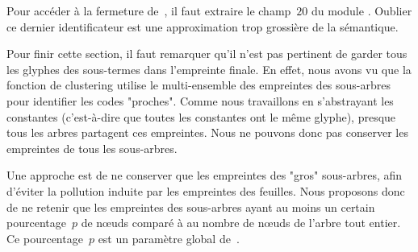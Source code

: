 Pour accéder à la fermeture de~, il faut
extraire le champ~$20$ du module . Oublier ce
dernier identificateur est une approximation trop grossière de
la sémantique.

Pour finir cette section, il faut remarquer qu'il n'est pas pertinent
de garder tous les glyphes des sous-termes dans l'empreinte finale.
En effet, nous avons vu que la fonction de clustering utilise le
multi-ensemble des empreintes des sous-arbres pour identifier les
codes "proches". Comme nous travaillons en s'abstrayant les constantes
(c'est-à-dire que toutes les constantes ont le même glyphe), presque
tous les arbres partagent ces empreintes. Nous ne pouvons donc pas
conserver les empreintes de tous les sous-arbres.

Une approche est de ne conserver que les empreintes des "gros"
sous-arbres, afin d'éviter la pollution induite par les empreintes des
feuilles. Nous proposons donc de ne retenir que les empreintes des
sous-arbres ayant au moins un certain pourcentage~$p$ de nœuds comparé à
au nombre de nœuds de l'arbre tout entier. Ce pourcentage~$p$ est un
paramètre global de~{\Asak}.
